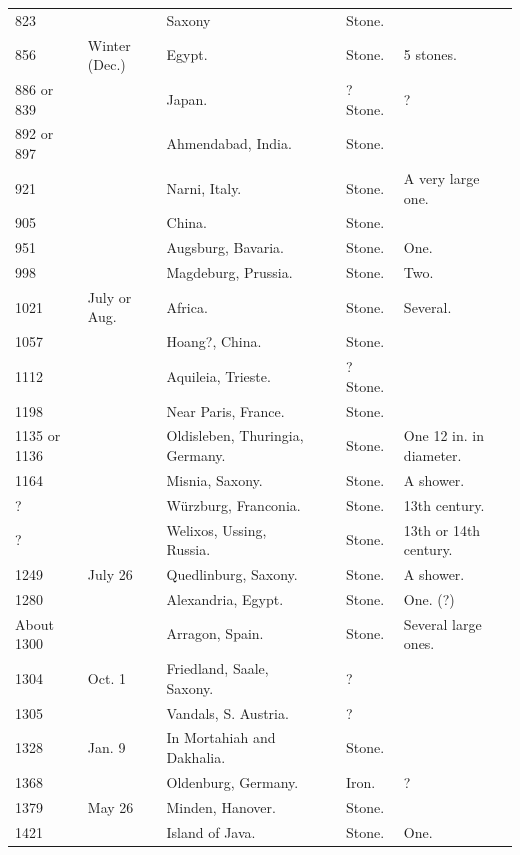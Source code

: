 \documentclass[a4paper, 12pt, oneside]{article}
\begin{document}
\begin{center}
\begin{longtable}{|p{10mm}|p{15mm}|p{32mm}|p{13mm}|p{13mm}|p{26mm}|}
        823 & ~ & Saxony & ~ & Stone. & ~ \\
        856 & Winter (Dec.) & Egypt. & ~ & Stone. & 5 stones. \\
        886 or 839 & ~ & Japan. & ~ & ? Stone. & ? \\
        892 or 897 & ~ & Ahmendabad, India. & ~ & Stone. & ~ \\
        921 & ~ & Narni, Italy. & ~ & Stone. & A very large one. \\
        905 & ~ & China. & ~ & Stone. & ~ \\
        951 & ~ & Augsburg, Bavaria. & ~ & Stone. & One. \\
        998 & ~ & Magdeburg, Prussia. & ~ & Stone. & Two. \\
        1021 & July or Aug. & Africa. & ~ & Stone. & Several. \\
        1057 & ~ & Hoang?, China. & ~ & Stone. & ~ \\
        1112 & ~ & Aquileia, Trieste. & ~ & ? Stone. & ~ \\
        1198 & ~ & Near Paris, France. & ~ & Stone. & ~ \\
        1135 or 1136 & ~ & Oldisleben, Thuringia, Germany. & ~ & Stone. & One 12 in. in diameter. \\
        1164 & ~ & Misnia, Saxony. & ~ & Stone. & A shower. \\
        ? & ~ & Würzburg, Franconia. & ~ & Stone. & 13th century. \\
        ? & ~ & Welixos, Ussing, Russia. & ~ & Stone. & 13th or 14th century. \\
        1249 & July 26 & Quedlinburg, Saxony. & ~ & Stone. & A shower. \\
        1280 & ~ & Alexandria, Egypt. & ~ & Stone. & One. (?) \\
        About 1300 & ~ & Arragon, Spain. & ~ & Stone. & Several large ones. \\
        1304 & Oct. 1 & Friedland, Saale, Saxony. & ~ & ? & ~ \\
        1305 & ~ & Vandals, S. Austria. & ~ & ? & ~ \\
        1328 & Jan. 9 & In Mortahiah and Dakhalia. & ~ & Stone. & ~ \\
        1368 & ~ & Oldenburg, Germany. & ~ & Iron. & ? \\
        1379 & May 26 & Minden, Hanover. & ~ & Stone. & ~ \\
        1421 & ~ & Island of Java. & ~ & Stone. & One. \\

\end{longtable}
\end{center}
\end{document}
